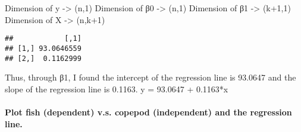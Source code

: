 \documentclass[]{article}
\newenvironment{Shaded}{\begin{snugshade}}{\end{snugshade}}
\newcommand{\KeywordTok}[1]{\textcolor[rgb]{0.13,0.29,0.53}{\textbf{{#1}}}}
\newcommand{\DataTypeTok}[1]{\textcolor[rgb]{0.13,0.29,0.53}{{#1}}}
\newcommand{\DecValTok}[1]{\textcolor[rgb]{0.00,0.00,0.81}{{#1}}}
\newcommand{\StringTok}[1]{\textcolor[rgb]{0.31,0.60,0.02}{{#1}}}
\newcommand{\CommentTok}[1]{\textcolor[rgb]{0.56,0.35,0.01}{\textit{{#1}}}}
\newcommand{\OtherTok}[1]{\textcolor[rgb]{0.56,0.35,0.01}{{#1}}}
\newcommand{\NormalTok}[1]{{#1}}
\let\oldparagraph\paragraph
\renewcommand{\paragraph}[1]{\oldparagraph{#1}\mbox{}}
\begin{document}
Dimension of y -\textgreater{} (n,1) Dimension of β0 -\textgreater{}
(n,1) Dimension of β1 -\textgreater{} (k+1,1) Dimension of X
-\textgreater{} (n,k+1)

\begin{Shaded}
\end{Shaded}

\begin{verbatim}
##            [,1]
## [1,] 93.0646559
## [2,]  0.1162999
\end{verbatim}

\begin{Shaded}
\end{Shaded}

Thus, through β1, I found the intercept of the regression line is
93.0647 and the slope of the regression line is 0.1163. y = 93.0647 +
0.1163*x

\paragraph{Plot fish (dependent) v.s. copepod (independent) and the
regression
line.}\label{plot-fish-dependent-v.s.-copepod-independent-and-the-regression-line.}
\end{document}
